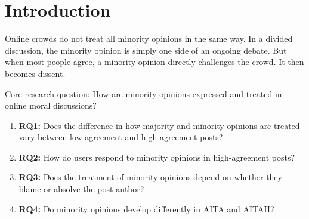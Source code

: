 \section{Introduction}
\label{sec:intro}





Online crowds do not treat all minority opinions in the same way. In a divided discussion, the minority opinion is simply one side of an ongoing debate. But when most people agree, a minority opinion directly challenges the crowd. It then becomes dissent.

Core research question: How are minority opinions expressed and treated in online moral discussions? 

\begin{enumerate}
    \item \textbf{RQ1:} Does the difference in how majority and minority
    opinions are treated vary between low-agreement and
    high-agreement posts?

    \item \textbf{RQ2:} How do users respond to minority opinions in
    high-agreement posts?

    \item \textbf{RQ3:} Does the treatment of minority opinions depend
    on whether they blame or absolve the post author?

    \item \textbf{RQ4:} Do minority opinions develop differently in
    AITA and AITAH?
\end{enumerate}





